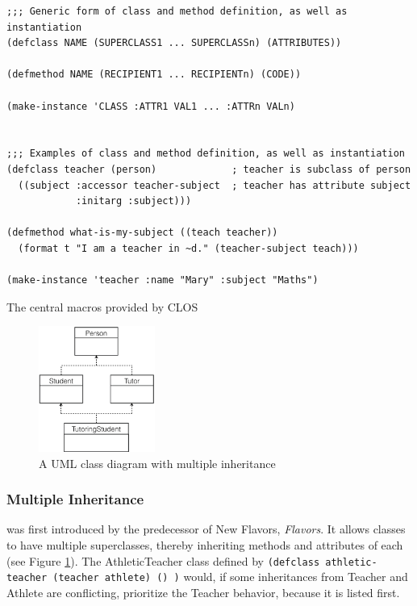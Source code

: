 \documentclass[oribibl]{llncs}
\begin{document}
\begin{listing}[]%
\begin{verbatim}
;;; Generic form of class and method definition, as well as instantiation
(defclass NAME (SUPERCLASS1 ... SUPERCLASSn) (ATTRIBUTES))

(defmethod NAME (RECIPIENT1 ... RECIPIENTn) (CODE))

(make-instance 'CLASS :ATTR1 VAL1 ... :ATTRn VALn)


;;; Examples of class and method definition, as well as instantiation
(defclass teacher (person)             ; teacher is subclass of person
  ((subject :accessor teacher-subject  ; teacher has attribute subject
            :initarg :subject)))

(defmethod what-is-my-subject ((teach teacher))       
  (format t "I am a teacher in ~d." (teacher-subject teach)))
  
(make-instance 'teacher :name "Mary" :subject "Maths")

\end{verbatim}
\caption{The central macros provided by CLOS}
\label{lst:clossyntax}
\end{listing}

\begin{figure}
  \begin{center}
    \includegraphics[width=0.34\textwidth]{images/multipleinheritance.png}
  \end{center}
  \caption{A UML class diagram with multiple inheritance}
  \label{fig:multipleinheritance}
\end{figure}

\subsubsection{Multiple Inheritance}
\label{sec:mulinh}
was first introduced by the predecessor of New Flavors, \emph{Flavors}. It allows classes to have multiple superclasses, thereby inheriting methods and attributes of each (see Figure \ref{fig:multipleinheritance}). The AthleticTeacher class defined by \texttt{(defclass athletic-teacher (teacher athlete) () )} would, if some inheritances from Teacher and Athlete are conflicting, prioritize the Teacher behavior, because it is listed first.  
\end{document}
